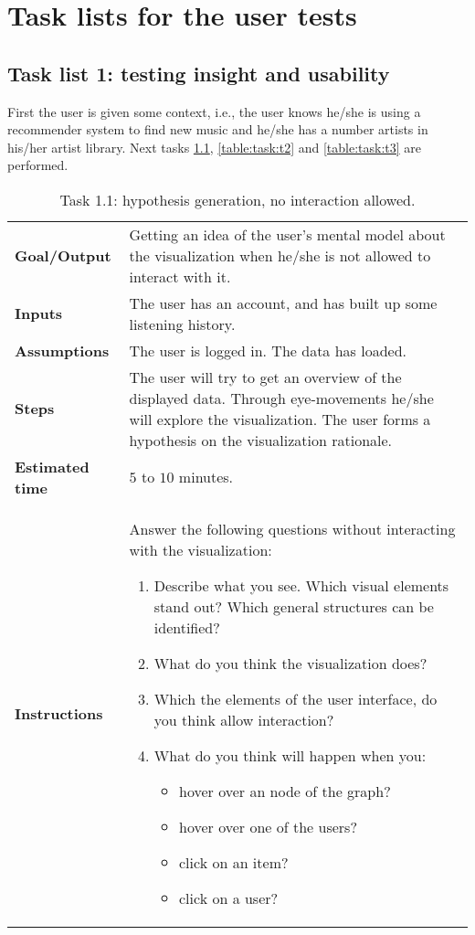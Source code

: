 \chapter{Task lists for the user tests}\label{appendix:tasklists}

\section{Task list 1: testing insight and usability}\label{appendix:tasklists:prototype1}

First the user is given some context, i.e., the user knows he/she is using a recommender system to find new music and he/she has a number artists in his/her artist library. Next tasks \ref{table:task:t1}, \ref{table:task:t2} and \ref{table:task:t3} are performed.

\begin{table}
	\caption{Task 1.1: hypothesis generation, no interaction allowed.}
	\begin{tabular}{ p{80px} | p{350px} }
		\hline
		\textbf{Goal/Output}			& Getting an idea of the user's mental model about the visualization when he/she is not allowed to interact with it. \\
		\textbf{Inputs}						& The user has an account, and has built up some listening history. \\
		\textbf{Assumptions}			& The user is logged in. The data has loaded. \\
		\textbf{Steps}						& The user will try to get an overview of the displayed data. Through eye-movements he/she will explore the visualization. The user forms a hypothesis on the visualization rationale. \\
		\textbf{Estimated time} 	& $5$ to $10$ minutes. \\
		\textbf{Instructions}			&
		
		Answer the following questions without interacting with the visualization:
		\begin{enumerate}
			\item Describe what you see. Which visual elements stand out? Which general structures can be identified?
			\item What do you think the visualization does?
			\item Which the elements of the user interface, do you think allow interaction?
			\item What do you think will happen when you:
				\begin{itemize}
					\item hover over an node of the graph?
					\item hover over one of the users?
					\item click on an item?
					\item click on a user?
				\end{itemize}
		\end{enumerate}
		\\
		\hline
	\end{tabular}
	\label{table:task:t1}
\end{table}

